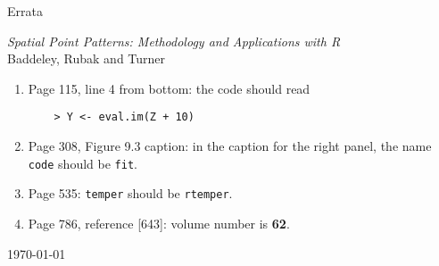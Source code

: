 \documentclass[12pt,a4paper]{article}
\begin{document}
\thispagestyle{empty}
\begin{center}
  \begin{LARGE}
    Errata 
  \end{LARGE}

  \begin{large}
    \emph{Spatial Point Patterns: Methodology and Applications with R}\\
    Baddeley, Rubak and Turner
  \end{large}
\end{center}

\begin{enumerate}
\item Page 115, line 4 from bottom: the code should read
\begin{verbatim}
    > Y <- eval.im(Z + 10)
\end{verbatim}
\item Page 308, Figure 9.3 caption: in the caption for the right panel,
the name \texttt{code} should be \texttt{fit}.
\item Page 535: \texttt{temper} should be \texttt{rtemper}.
\item Page 786, reference [643]: volume number is \textbf{62}.
\end{enumerate}

\vspace*{\fill}

\hspace*{\fill} \today
\end{document}
